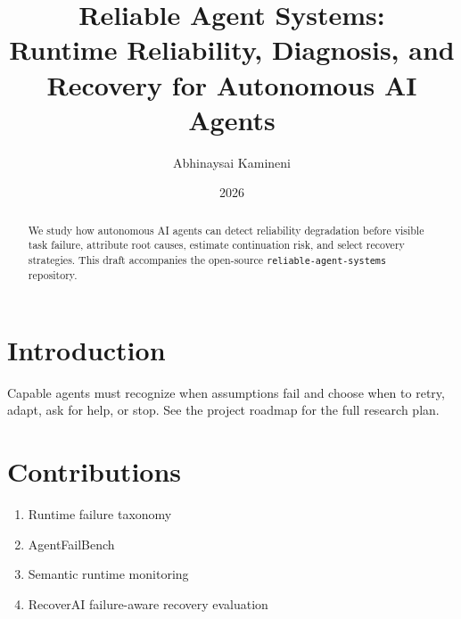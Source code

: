 \documentclass[11pt]{article}
\title{Reliable Agent Systems:\\
Runtime Reliability, Diagnosis, and Recovery for Autonomous AI Agents}
\author{Abhinaysai Kamineni}
\date{2026}
\begin{document}
\maketitle

\begin{abstract}
We study how autonomous AI agents can detect reliability degradation before
visible task failure, attribute root causes, estimate continuation risk, and
select recovery strategies. This draft accompanies the open-source
\texttt{reliable-agent-systems} repository.
\end{abstract}

\section{Introduction}
Capable agents must recognize when assumptions fail and choose when to retry,
adapt, ask for help, or stop. See the project roadmap for the full research plan.

\section{Contributions}
\begin{enumerate}
  \item Runtime failure taxonomy
  \item AgentFailBench
  \item Semantic runtime monitoring
  \item RecoverAI failure-aware recovery evaluation
\end{enumerate}



\end{document}
